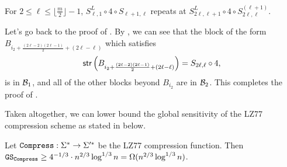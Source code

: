 \begin{proofof}{}
\begin{claim}
For $2\leq\ell\leq\lfloor\frac{m}{2}\rfloor-1$, $S_{\ell,1}^L\circ4\circ S_{\ell+1,\ell}$ repeats at $S_{2\ell,\ell+1}^L\circ4\circ S_{2\ell,\ell}^{(\ell+1)}$.
\end{claim}

Let's go back to the proof of . By , we can see that the block of the form $B_{i_2+\frac{(2\ell-2)(2\ell-1)}{2}+(2\ell-\ell)}$ which satisfies
\[\mathsf{str}\left(B_{i_2+\frac{(2\ell-2)(2\ell-1)}{2}+(2\ell-\ell)}\right)=S_{2\ell,\ell}\circ4,\]
is in ${\mathcal{B}}_1$, and all of the other blocks beyond $B_{i_2}$ are in ${\mathcal{B}}_2$. This completes the proof of .
\end{proofof}

Taken altogether, we can lower bound the global sensitivity of the LZ77 compression scheme as stated in  below.

\begin{theorem}
Let $\mathtt{Compress}:\Sigma^*\rightarrow\Sigma'^*$ be the LZ77 compression function. Then $\mathtt{GS}_{\mathtt{Compress}}\geq 4^{-1/3}\cdot n^{2/3}\log^{1/3}n=\Omega(n^{2/3}\log^{1/3}n)$. 
\end{theorem}

